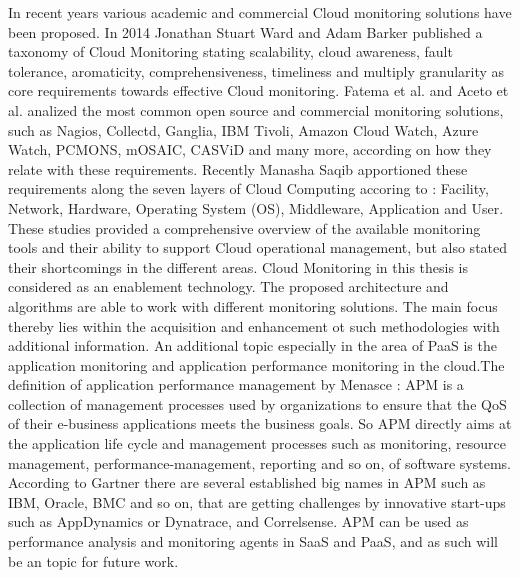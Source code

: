 In recent years various academic and commercial Cloud monitoring solutions have been proposed. In 2014 Jonathan Stuart Ward and Adam Barker \cite{ward2014observing} published a taxonomy of Cloud Monitoring stating scalability, cloud awareness, fault tolerance, aromaticity, comprehensiveness, timeliness and multiply granularity as core requirements towards effective Cloud monitoring. Fatema et al. \cite{fatema2014survey} and Aceto et al. \cite{aceto2013cloud} analized the most common open source and commercial monitoring solutions, such as Nagios, Collectd, Ganglia, IBM Tivoli, Amazon Cloud Watch, Azure Watch, PCMONS, mOSAIC, CASViD and many more, according on how they relate with these requirements. Recently Manasha Saqib \cite{saqib2017cloud} apportioned these requirements along the seven layers of Cloud Computing accoring to \cite{CSA3.0} \cite{spring2011monitoring1} \cite{spring2011monitoring2}: Facility, Network, Hardware, Operating System (OS), Middleware, Application and User. These studies provided a comprehensive overview of the available monitoring tools and their ability to support Cloud operational management, but also stated their shortcomings in the different areas. Cloud Monitoring in this thesis is considered as an enablement technology. The proposed architecture and algorithms are able to work with different monitoring solutions. The main focus thereby lies within the acquisition and enhancement ot such methodologies with additional information.
An additional topic especially in the area of PaaS is the application monitoring and application performance monitoring in the cloud.The definition of application performance management by Menasce \cite{menasce2002load}: APM is a collection of management processes used by organizations to ensure that the QoS of their e-business applications meets the business goals. So APM directly aims at the application life cycle and management processes such as monitoring, resource management, performance-management, reporting and so on, of software systems. According to Gartner \cite{GartnerAPM} there are several established big names in APM such as IBM, Oracle, BMC and so on, that are getting challenges by innovative start-ups such as AppDynamics or Dynatrace, and Correlsense. APM can be used as performance analysis and monitoring agents in SaaS and PaaS, and as such will be an topic for future work.


